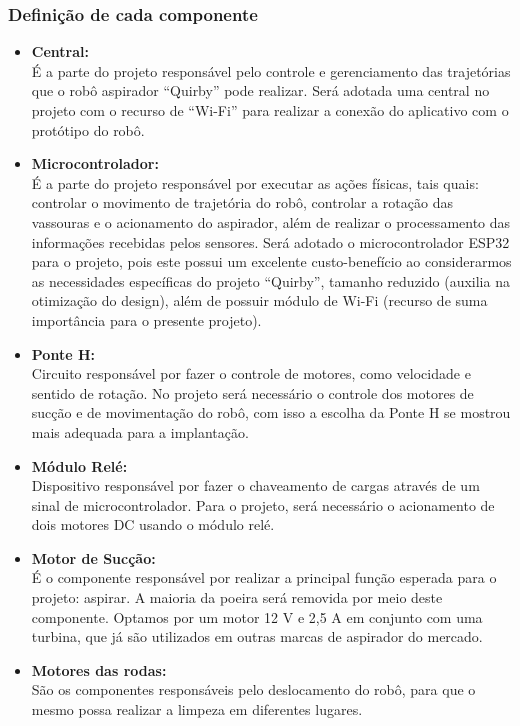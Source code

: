 \subsubsection{Definição de cada componente}
\begin{itemize}
\item \textbf{Central:} \\ É a parte do projeto responsável pelo controle e gerenciamento das trajetórias que o robô aspirador “Quirby” pode realizar. Será adotada uma central no projeto com o recurso de “Wi-Fi” para realizar a conexão do aplicativo com o protótipo do robô.
\item \textbf{Microcontrolador:} \\ É a parte do projeto responsável por executar as ações físicas, tais quais: controlar o movimento de trajetória do robô, controlar a rotação das vassouras e o acionamento do aspirador, além de realizar o processamento das informações recebidas pelos sensores. Será adotado o microcontrolador ESP32 \cite{ESPRESSIFMANUAL} para o projeto, pois este possui um excelente custo-benefício ao considerarmos as necessidades específicas do projeto “Quirby”, tamanho reduzido (auxilia na otimização do design), além de possuir módulo de Wi-Fi (recurso de suma importância para o presente projeto).
\item \textbf{Ponte H:} \\ Circuito responsável por fazer o controle de motores, como velocidade e sentido de rotação. No projeto será necessário o controle dos motores de sucção e de movimentação do robô, com isso a escolha da Ponte H se mostrou mais adequada para a implantação.
\item \textbf{Módulo Relé:} \\ Dispositivo responsável por fazer o chaveamento de cargas através de um sinal de microcontrolador. Para o projeto, será necessário o acionamento de dois motores DC usando o módulo relé.
\item \textbf{Motor de Sucção:} \\ É o componente responsável por realizar a principal função esperada para o projeto: aspirar. A maioria da poeira será removida por meio deste componente. Optamos por um motor 12 V e 2,5 A em conjunto com uma turbina, que já são utilizados em outras marcas de aspirador do mercado. 
\item\textbf{Motores das rodas:} \\ São os componentes responsáveis pelo deslocamento do robô, para que o mesmo possa realizar a limpeza em diferentes lugares.

\end{itemize}
